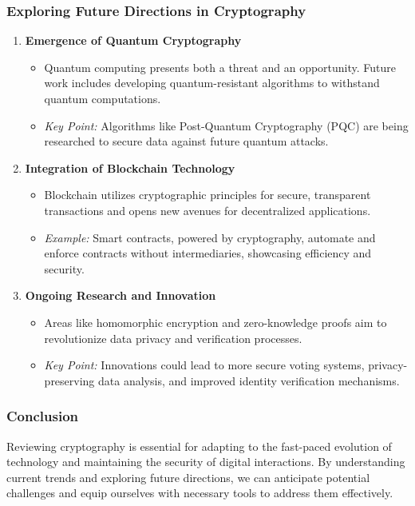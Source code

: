 \documentclass{beamer}
\begin{document}
\begin{frame}[fragile]
    \frametitle{Exploring Future Directions in Cryptography}
    \begin{enumerate}
        \item \textbf{Emergence of Quantum Cryptography}
            \begin{itemize}
                \item Quantum computing presents both a threat and an opportunity. Future work includes developing quantum-resistant algorithms to withstand quantum computations.
                \item \textit{Key Point:} Algorithms like Post-Quantum Cryptography (PQC) are being researched to secure data against future quantum attacks.
            \end{itemize}
        \item \textbf{Integration of Blockchain Technology}
            \begin{itemize}
                \item Blockchain utilizes cryptographic principles for secure, transparent transactions and opens new avenues for decentralized applications.
                \item \textit{Example:} Smart contracts, powered by cryptography, automate and enforce contracts without intermediaries, showcasing efficiency and security.
            \end{itemize}
        \item \textbf{Ongoing Research and Innovation}
            \begin{itemize}
                \item Areas like homomorphic encryption and zero-knowledge proofs aim to revolutionize data privacy and verification processes.
                \item \textit{Key Point:} Innovations could lead to more secure voting systems, privacy-preserving data analysis, and improved identity verification mechanisms.
            \end{itemize}
    \end{enumerate}
\end{frame}

\begin{frame}[fragile]
    \frametitle{Conclusion}
    Reviewing cryptography is essential for adapting to the fast-paced evolution of technology and maintaining the security of digital interactions. 
    By understanding current trends and exploring future directions, we can anticipate potential challenges and equip ourselves with necessary tools to address them effectively.
\end{frame}
\end{document}
